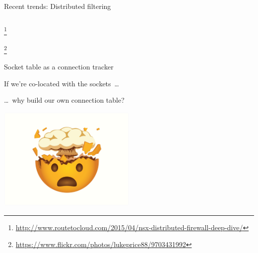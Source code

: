\documentclass[black,white]{beamer}
\newcommand\blfootnote[1]{%
  \begingroup
  \renewcommand\thefootnote{}\footnote{#1}%
  \addtocounter{footnote}{-1}%
  \endgroup
}
\begin{document}
\begin{frame}{Recent trends: Distributed filtering}
\begin{columns}[c]
\begin{column}{0.5\textwidth}
            \end{column}
        \end{columns}
        \blfootnote{%
            \tiny\url{http://www.routetocloud.com/2015/04/nsx-distributed-firewall-deep-dive/}}
        \blfootnote{%
            \tiny\url{https://www.flickr.com/photos/lukeprice88/9703431992}}
    \end{frame}


    \begin{frame}{Socket table as a connection tracker}
        \begin{flushleft}
	    If we're co-located with the sockets~\ldots \medskip
        \end{flushleft}
        \begin{flushright}
            \ldots~why build our own connection table? \medskip
        \end{flushright}
	\begin{center}
        \includegraphics[width=0.5\textwidth]{mindblown.png}
	\end{center}
    \end{frame}
\end{document}
